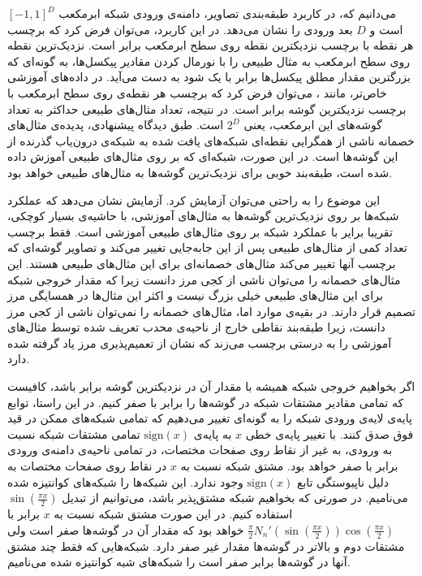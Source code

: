 \documentclass[12pt,onecolumn,a4paper]{article}
\begin{document}
می‌دانیم که، در کاربرد طبقه‌بندی تصاویر، دامنه‌ی ورودی شبکه ابرمکعب $[-1,1]^D$ است و $D$ بعد ورودی را نشان می‌دهد. در این کاربرد، می‌توان فرض کرد که برچسب هر نقطه با برچسب نزدیکترین نقطه روی سطح ابرمکعب برابر است. نزدیک‌ترین نقطه روی سطح ابرمکعب به مثال طبیعی را با نورمال کردن مقادیر پیکسل‌ها، به گونه‌ای که بزرگترین مقدار مطلق پیکسل‌ها برابر با یک شود به دست می‌آید. در داده‌های آموزشی خاص‌تر، مانند 
، 
می‌توان فرض کرد که برچسب هر نقطه‌ی روی سطح ابرمکعب با برچسب نزدیکترین گوشه برابر است. در نتیجه، تعداد مثال‌های طبیعی حداکثر به تعداد گوشه‌های این ابرمکعب، یعنی $2^D$ است. طبق دیدگاه پیشنهادی، پدیده‌ی مثال‌های خصمانه ناشی از همگرایی نقطه‌ای شبکه‌ها‌ی یافت شده به شبکه‌ی درون‌یاب گذرنده از این گوشه‌ها است. در این صورت، شبکه‌ای که بر روی مثال‌های طبیعی آموزش داده شده است،  طبقه‌بند خوبی برای نزدیک‌ترین گوشه‌ها به مثال‌های طبیعی خواهد بود. 

 این موضوع را به راحتی می‌توان آزمایش کرد. آزمایش نشان می‌دهد که عملکرد شبکه‌ها بر روی نزدیک‌ترین گوشه‌ها به مثال‌های آموزشی، با حاشیه‌ی بسیار کوچکی، تقریبا برایر با عملکرد شبکه بر روی مثال‌های طبیعی آموزشی است. فقط برچسب تعداد کمی از مثال‌های طبیعی پس از این جابه‌جایی تغییر می‌کند و تصاویر گوشه‌ای که برچسب آنها تغییر می‌کند مثال‌های خصمانه‌ای برای این مثال‌های طبیعی هستند. این مثال‌های خصمانه را می‌توان ناشی از کجی مرز دانست زیرا که مقدار خروجی شبکه برای این مثال‌های طبیعی خیلی بزرگ نیست و اکثر این مثال‌ها در همسایگی مرز تصمیم قرار دارند. در بقیه‌ی موارد اما، مثال‌های خصمانه را نمی‌توان ناشی از کجی مرز دانست، زیرا طبقه‌بند نقاطی خارج از ناحیه‌ی محدب تعریف شده توسط مثال‌های آموزشی را به درستی برچسب می‌زند که نشان از تعمیم‌پذیری مرز یاد گرفته شده دارد.

اگر بخواهیم خروجی شبکه همیشه با مقدار آن در نزدیکترین گوشه برابر باشد، کافیست که تمامی مقادیر مشتقات شبکه در گوشه‌ها را برابر با صفر کنیم. در این راستا، توابع پایه‌ی لایه‌ی ورودی شبکه را به گونه‌ای تغییر می‌دهیم که تمامی شبکه‌های ممکن در قید فوق صدق کنند. با تغییر پایه‌ی خطی $x$ به پایه‌ی $\mathrm{sign}(x)$ تمامی مشتقات شبکه نسبت به ورودی، به غیر از نقاط روی صفحات مختصات، در تمامی ناحیه‌ی دامنه‌ی ورودی برابر با صفر خواهد بود. مشتق شبکه نسبت به $x$ در نقاط روی صفحات مختصات به دلیل ناپیوستگی تابع $\mathrm{sign}(x)$ وجود ندارد. این شبکه‌ها را شبکه‌های کوانتیزه شده می‌نامیم. در صورتی که بخواهیم شبکه مشتق‌پذیر باشد، می‌توانیم از تبدیل $\sin(\frac{\pi x}{2})$ استفاده کنیم. در این صورت مشتق شبکه نسبت به $x$ برابر با $\frac{\pi}{2}N_n'(\sin(\frac{\pi x}{2}))\cos(\frac{\pi x}{2})$ خواهد بود که مقدار آن در گوشه‌ها صفر است ولی مشتقات دوم و بالاتر در گوشه‌ها مقدار غیر صفر دارد. شبکه‌هایی که فقط چند مشتق آنها در گوشه‌ها برابر صفر است را شبکه‌های شبه کوانتیزه شده می‌نامیم.
\end{document}
